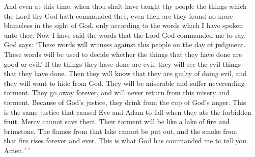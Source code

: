 And even at this time, when thou shalt have taught thy people the things which the Lord thy God hath commanded thee, even then are they found no more blameless in the sight of God, only according to the words which I have spoken unto thee.
\bverse \iffalse And now I have spoken the words which the Lord God hath commanded me. \fi
Now I have said the words that the Lord God commanded me to say.
\bverse \iffalse And thus saith the Lord: They shall stand as a bright testimony against this people, at the judgment day; whereof they shall be judged, every man according to his works, whether they be good, or whether they be evil. \fi
God says: \lq These words will witness against this people on the day of judgment. These words will be used to decide whether the things that they have done are good or evil.\rq
\bverse \iffalse And if they be evil they are consigned to an awful view of their own guilt and abominations, which doth cause them to shrink from the presence of the Lord into a state of misery and endless torment, from whence they can no more return; therefore they have drunk damnation to their own souls. \fi
If the things they have done are evil, they will see the evil things that they have done. Then they will know that they are guilty of doing evil, and they will want to hide from God. They will be miserable and suffer neverending torment. They go away forever, and will never return from this misery and torment. 
\bverse \iffalse Therefore, they have drunk out of the cup of the wrath of God, which justice could no more deny unto them than it could deny that Adam should fall because of his partaking of the forbidden fruit; therefore, mercy could have claim on them no more forever. \fi
Because of God's justice, they drink from the cup of God's anger. This is the same justice that caused Eve and Adam to fall when they ate the forbidden fruit. Mercy cannot save them.
\bverse \iffalse And their torment is as a lake of fire and brimstone, whose flames are unquenchable, and whose smoke ascendeth up forever and ever. Thus hath the Lord commanded me. Amen. \fi
Their torment will be like a lake of fire and brimstone. The flames from that lake cannot be put out, and the smoke from that fire rises forever and ever. This is what God has commanded me to tell you. Amen.´´

